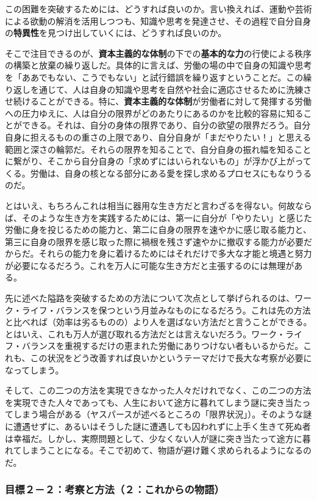 この困難を突破するためには、どうすれば良いのか。言い換えれば、運動や芸術による欲動の解消を活用しつつも、知識や思考を発達させ、その過程で自分自身の\textbf{特異性}を見つけ出していくには、どうすれば良いのか。

そこで注目できるのが、\textbf{資本主義的な体制}の下での\textbf{基本的な力}の行使による秩序の構築と放棄の繰り返しだ。具体的に言えば、労働の場の中で自身の知識や思考を「ああでもない、こうでもない」と試行錯誤を繰り返すということだ。この繰り返しを通じて、人は自身の知識や思考を自然や社会に適応させるために洗練させ続けることができる。特に、\textbf{資本主義的な体制}が労働者に対して発揮する労働への圧力ゆえに、人は自分の限界がどのあたりにあるのかを比較的容易に知ることができる。それは、自分の身体の限界であり、自分の欲望の限界だろう。自分自身に担えるものの重さの上限であり、自分自身が「まだやりたい！」と思える範囲と深さの輪郭だ。それらの限界を知ることで、自分自身の振れ幅を知ることに繋がり、そこから自分自身の「求めずにはいられないもの」が浮かび上がってくる。労働は、自身の核となる部分にある愛を探し求めるプロセスにもなりうるのだ。

とはいえ、もちろんこれは相当に器用な生き方だと言わざるを得ない。何故ならば、そのような生き方を実践するためには、第一に自分が「やりたい」と感じた労働に身を投じるための能力と、第二に自身の限界を速やかに感じ取る能力と、第三に自身の限界を感じ取った際に禍根を残さず速やかに撤収する能力が必要だからだ。それらの能力を身に着けるためにはそれだけで多大な才能と境遇と努力が必要になるだろう。これを万人に可能な生き方だと主張するのには無理がある。

先に述べた隘路を突破するための方法について次点として挙げられるのは、ワーク・ライフ・バランスを保つという月並みなものになるだろう。これは先の方法と比べれば（効率は劣るものの）より人を選ばない方法だと言うことができる。とはいえ、これも万人が選び取れる方法だとは言えないだろう。ワーク・ライフ・バランスを重視するだけの恵まれた労働にありつけない者もいるからだ。これも、この状況をどう改善すれば良いかというテーマだけで長大な考察が必要になってしまう。

そして、この二つの方法を実現できなかった人々だけれでなく、この二つの方法を実現できた人々であっても、人生において途方に暮れてしまう謎に突き当たってしまう場合がある（ヤスパースが述べるところの「限界状況」）。そのような謎に遭遇せずに、あるいはそうした謎に遭遇しても囚われずに上手く生きて死ぬ者は幸福だ。しかし、実際問題として、少なくない人が謎に突き当たって途方に暮れてしまうことになる。そこで初めて、物語が避け難く求められるようになるのだ。

\subsubsection{目標２－２：考察と方法（２：これからの物語）}\label{ux76eeux6a19uxff12uxff12ux8003ux5bdfux3068ux65b9ux6cd5uxff12ux3053ux308cux304bux3089ux306eux7269ux8a9e}

